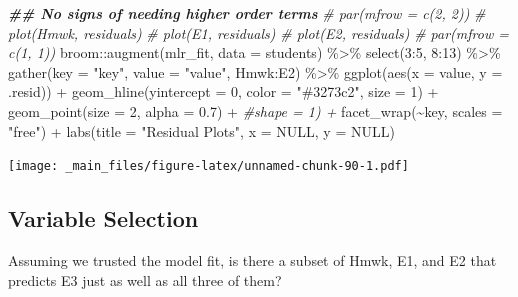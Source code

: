 \documentclass[
]{book}
\newenvironment{Shaded}{\begin{snugshade}}{\end{snugshade}}
\newcommand{\AttributeTok}[1]{\textcolor[rgb]{0.77,0.63,0.00}{#1}}
\newcommand{\CommentTok}[1]{\textcolor[rgb]{0.56,0.35,0.01}{\textit{#1}}}
\newcommand{\ConstantTok}[1]{\textcolor[rgb]{0.00,0.00,0.00}{#1}}
\newcommand{\DecValTok}[1]{\textcolor[rgb]{0.00,0.00,0.81}{#1}}
\newcommand{\DocumentationTok}[1]{\textcolor[rgb]{0.56,0.35,0.01}{\textbf{\textit{#1}}}}
\newcommand{\FloatTok}[1]{\textcolor[rgb]{0.00,0.00,0.81}{#1}}
\newcommand{\FunctionTok}[1]{\textcolor[rgb]{0.00,0.00,0.00}{#1}}
\newcommand{\NormalTok}[1]{#1}
\newcommand{\SpecialCharTok}[1]{\textcolor[rgb]{0.00,0.00,0.00}{#1}}
\newcommand{\StringTok}[1]{\textcolor[rgb]{0.31,0.60,0.02}{#1}}
\begin{document}
\begin{Shaded}
\begin{Highlighting}[]
\DocumentationTok{\#\# No signs of needing higher order terms}
\CommentTok{\# par(mfrow = c(2, 2))}
\CommentTok{\# plot(Hmwk, residuals)}
\CommentTok{\# plot(E1, residuals)}
\CommentTok{\# plot(E2, residuals)}
\CommentTok{\# par(mfrow = c(1, 1))}
\NormalTok{broom}\SpecialCharTok{::}\FunctionTok{augment}\NormalTok{(mlr\_fit, }\AttributeTok{data =}\NormalTok{ students) }\SpecialCharTok{\%\textgreater{}\%} 
  \FunctionTok{select}\NormalTok{(}\DecValTok{3}\SpecialCharTok{:}\DecValTok{5}\NormalTok{, }\DecValTok{8}\SpecialCharTok{:}\DecValTok{13}\NormalTok{) }\SpecialCharTok{\%\textgreater{}\%} 
  \FunctionTok{gather}\NormalTok{(}\AttributeTok{key =} \StringTok{"key"}\NormalTok{, }\AttributeTok{value =} \StringTok{"value"}\NormalTok{, Hmwk}\SpecialCharTok{:}\NormalTok{E2) }\SpecialCharTok{\%\textgreater{}\%} 
  \FunctionTok{ggplot}\NormalTok{(}\FunctionTok{aes}\NormalTok{(}\AttributeTok{x =}\NormalTok{ value, }\AttributeTok{y =}\NormalTok{ .resid)) }\SpecialCharTok{+} 
  \FunctionTok{geom\_hline}\NormalTok{(}\AttributeTok{yintercept =} \DecValTok{0}\NormalTok{, }\AttributeTok{color =} \StringTok{"\#3273c2"}\NormalTok{, }\AttributeTok{size =} \DecValTok{1}\NormalTok{) }\SpecialCharTok{+}
  \FunctionTok{geom\_point}\NormalTok{(}\AttributeTok{size =} \DecValTok{2}\NormalTok{, }\AttributeTok{alpha =} \FloatTok{0.7}\NormalTok{) }\SpecialCharTok{+} \CommentTok{\#shape = 1) +}
  \FunctionTok{facet\_wrap}\NormalTok{(}\SpecialCharTok{\textasciitilde{}}\NormalTok{key, }\AttributeTok{scales =} \StringTok{"free"}\NormalTok{) }\SpecialCharTok{+}
  \FunctionTok{labs}\NormalTok{(}\AttributeTok{title =} \StringTok{"Residual Plots"}\NormalTok{, }
       \AttributeTok{x =} \ConstantTok{NULL}\NormalTok{, }
       \AttributeTok{y =} \ConstantTok{NULL}\NormalTok{)}
\end{Highlighting}
\end{Shaded}

\texttt{[image: \_main\_files/figure-latex/unnamed-chunk-90-1.pdf]}

\hypertarget{variable-selection}{%
\subsection{Variable Selection}\label{variable-selection}}

Assuming we trusted the model fit, is there a subset of Hmwk, E1, and E2 that predicts E3 just as well as all three of them?
\end{document}
